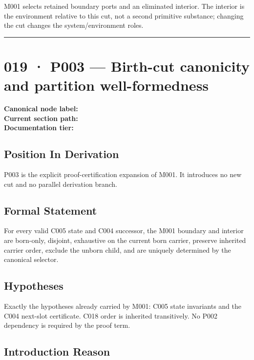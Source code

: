M001 selects retained boundary ports and an eliminated interior. The
interior is the environment relative to this cut, not a second primitive
substance; changing the cut changes the system/environment roles.

\begin{center}\rule{0.5\linewidth}{0.5pt}\end{center}

\section{019 · P003 --- Birth-cut canonicity and partition
well-formedness}\label{p003-birth-cut-canonicity-and-partition-well-formedness}

\textbf{Canonical node label:} \texttt{\protect{}}\\
\textbf{Current section path:} \texttt{\protect{}}\\
\textbf{Documentation tier:} \texttt{\protect{}}

\subsection{Position In Derivation}\label{position-in-derivation-15}

P003 is the explicit proof-certification expansion of M001. It
introduces no new cut and no parallel derivation branch.

\subsection{Formal Statement}\label{formal-statement-5}

For every valid C005 state and C004 successor, the M001 boundary and
interior are born-only, disjoint, exhaustive on the current born
carrier, preserve inherited carrier order, exclude the unborn child, and
are uniquely determined by the canonical selector.

\subsection{Hypotheses}\label{hypotheses-5}

Exactly the hypotheses already carried by M001: C005 state invariants
and the C004 next-slot certificate. C018 order is inherited
transitively. No P002 dependency is required by the proof term.

\subsection{Introduction Reason}\label{introduction-reason-18}

